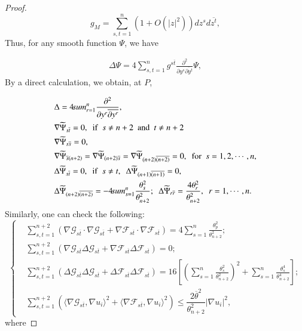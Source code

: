 \documentclass[12pt]{article}
\numberwithin{equation}{section}
\begin{document}
\begin{proof}
$$g_{M}=\sum^{n}_{s,t=1}\left(1+O\left(|z|^{2}\right)\right)dz^{s}d\overline{z^{t}},$$Thus, for any smooth function $\Psi$, we have


\begin{equation*}\begin{aligned}\Delta \Psi=4\sum^{n}_{s,t=1}g^{s\overline{t}}\frac{\partial^{2}}{\partial y^{s}\overline{\partial y^{t}}} \Psi,\end{aligned}\end{equation*}
By a direct calculation, we obtain, at $P$,


\begin{equation*}\begin{aligned}&\Delta =4\sum^{n}_{r=1}\frac{\partial^{2}}{\partial y^{r}\overline{\partial y^{r}}},\\
&\nabla \widetilde{\Psi}_{s\overline{t}}= 0, \ \ {\rm  if}\ \  s\neq n+2\ \  {\rm  and} \ \ t\neq n+2\\
&\nabla \widetilde{\Psi}_{s\overline{s}}= 0,\\
&\nabla \widetilde{\Psi}_{\overline{s}(n+2)}= \nabla \widetilde{\Psi}_{(n+2)\overline{s}}
= \nabla \widetilde{\Psi}_{(n+2)\overline{(n+2)}}= 0, \ \ {\rm for}\ \ s=1,2,\cdots,n,\\
&\Delta \widetilde{\Psi}_{s\overline{t}}= 0, \ \ {\rm if} \ \ s\neq t,\ \ \Delta \widetilde{\Psi}_{(n+1)\overline{(n+1)}} =0,\\
&\Delta \widetilde{\Psi}_{(n+2)\overline{(n+2)}}=-4\sum^{n}_{s=1}\frac{\theta_{s}^{2}}{\theta_{n+2}^{2}};
\ \  \Delta \widetilde{\Psi}_{r\overline{r}}=\frac{4\theta_{r}^{2}}{\theta_{n+2}^{2}},\ \ r=1,\cdots,n.
\end{aligned}\end{equation*}
Similarly, one can check the following:
\begin{equation}\left\{\begin{aligned}\label{z-a}&\sum^{n+2}_{s,t=1}\left(\nabla \mathcal{G}_{s\overline{t}}\cdot\nabla \mathcal{G}_{s\overline{t}}
+\nabla \mathcal{F}_{s\overline{t}}\cdot\nabla \mathcal{F}_{s\overline{t}}\right)=4\sum^{n}_{s=1}\frac{\theta_{p}^{2}}{\theta_{n+2}^{2}};
\\&\sum^{n+2}_{s,t=1}\left(\nabla \mathcal{G}_{s\overline{t}}\Delta \mathcal{G}_{s\overline{t}}+\nabla \mathcal{F}_{s\overline{t}}\Delta \mathcal{F}_{s\overline{t}}\right)=0;
\\&\sum^{n+2}_{s,t=1}\left(\Delta \mathcal{G}_{s\overline{t}}\Delta \mathcal{G}_{s\overline{t}}+\Delta \mathcal{F}_{s\overline{t}}\Delta \mathcal{F}_{s\overline{t}}\right)=
16\left[\left(\sum^{n}_{s=1}\frac{\theta_{s}^{2}}{\theta_{n+2}^{2}}\right)^{2}+\sum^{n}_{s=1}\frac{\theta_{s}^{4}}{\theta_{n+2}^{4}}  \right];
\\&\sum^{n+2}_{s,t=1}\left(\langle\nabla \mathcal{G}_{s\overline{t}},\nabla u_{i}\rangle^{2}
+\langle\nabla \mathcal{F}_{s\overline{t}},\nabla u_{i}\rangle^{2}\right)\leq\dfrac{2\overline{\theta}^{2}}{\theta^{2}_{n+2}}|\nabla u_{i}|^{2},
\end{aligned}\right.\end{equation}where


\end{proof}
\end{document}
